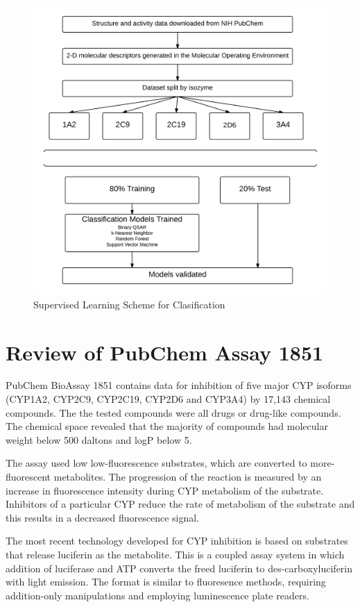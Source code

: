 
\begin{figure}[!htp]
  \caption{Supervised Learning Scheme for Clasification}
  \centering
  \includegraphics[width=1\textwidth]{../img/Supervised_Workflow.png}
\end{figure}


\section{Review of PubChem Assay 1851}
  

PubChem BioAssay 1851 contains data for inhibition of five major CYP isoforms (CYP1A2, CYP2C9, CYP2C19, CYP2D6 and CYP3A4) by 17,143 chemical compounds. \cite{Veith2009} The the tested compounds were all drugs or drug-like compounds. The chemical space revealed that the majority of compounds had molecular weight below 500 daltons and logP below 5. \cite{Lapins2013}

The assay used low low-fluorescence substrates, which are converted to more-fluorescent metabolites. The progression of the reaction is measured by an increase in fluorescence intensity during CYP metabolism of the substrate. Inhibitors of a particular CYP reduce the rate of metabolism of the substrate and this results in a decreased fluorescence signal. \cite{Zlokarnik2005}

The most recent technology developed for CYP inhibition is based on substrates that release luciferin as the metabolite. This is a coupled assay system in which addition of luciferase and ATP converts the freed luciferin to des-carboxyluciferin with light emission. The format is similar to fluoresence methods, requiring addition-only manipulations and employing luminescence plate readers. \cite{Zlokarnik2005}

